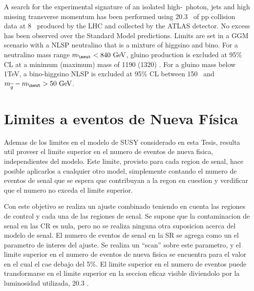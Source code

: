


A search for the experimental signature of an isolated high-\pt\ photon, jets
and high missing transverse momentum has been performed using 20.3 \ifb\ of pp
collision data at 8 \tev\ produced by the LHC and collected by the ATLAS
detector. No excess has been observed over the Standard Model predictions.
Limits are set in a GGM scenario with a NLSP neutralino that is a mixture of
higgsino and bino. For a neutralino mass range $m_{\neut}<{840}\gev$, gluino
production is excluded at 95\% CL at a minimum (maximum) mass of 1190 (1320)
\gev. For a gluino mass below 1TeV, a bino-higgsino NLSP is excluded at 95\% CL
between 150 \gev\ and $m_{\gluino}-m_{\neut}>50\gev$.



\section{Limites a eventos de Nueva Física} \label{sec:model_independent}



Ademas de los limites en el modelo de SUSY considerado en esta Tesis,
resulta util proveer el limite superior en el numero de eventos de nueva fisica,
independientes del modelo. Este limite, provisto para cada region de senal,
hace posible aplicarlos a cualquier otro model, simplemente contando
el numero de eventos de senal que se espera que contribuyan a la regon en cuestion
y verdificar que el numero no exceda el limite superior.

Con este objetivo se realiza un ajuste combinado teniendo en cuenta las regiones
de control y cada una de las regiones de senal. Se supone que la contaminacion
de senal en las CR es nula, pero no se realiza ninguna otra suposicion acerca
del modelo de senal. El numero de eventos de senal en la SR se agrega como un
el parametro de interes del ajuste. Se realiza un ``scan'' sobre este parametro,
y el limite superior en el numero de eventos de nueva fisica se encuentra para el
valor en el cual el {\cls} cae debajo del 5\%. El limite superior en el numero de
eventos puede transformarse en el limite superior en la seccion eficaz visible diviendolo
por la luminosidad utilizada, 20.3 \ifb.


